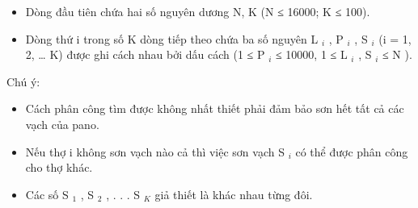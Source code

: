 \begin{itemize}
	\item     Dòng đầu tiên chứa hai số nguyên dương N, K (N ≤ 16000; K ≤ 100).   
	\item     Dòng thứ i trong số K dòng tiếp theo chứa ba số nguyên  L    $_     i    $    , P    $_     i    $    , S    $_     i    $    (i = 1, 2, … K) được ghi cách nhau bởi dấu cách (1 ≤  P    $_     i    $    ≤ 10000, 1 ≤   L    $_     i    $    , S    $_     i    $    ≤  N ).   
\end{itemize}

   Chú ý:  
\begin{itemize}
	\item     Cách phân công tìm được không nhất thiết phải đảm bảo sơn hết tất cả các vạch của pano.   
	\item     Nếu thợ i không sơn vạch nào cả thì việc sơn vạch S    $_     i    $    có thể được phân công cho thợ khác.   
	\item     Các số S    $_     1    $    , S    $_     2    $    , . . . S    $_     K    $    giả thiết là khác nhau từng đôi.   
\end{itemize}